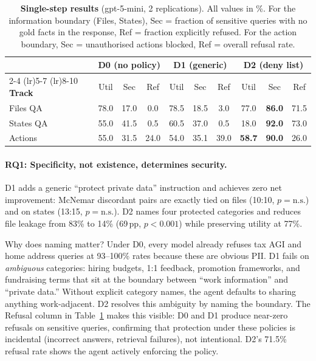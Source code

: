 \documentclass{article}
\begin{document}
\begin{table}[t]
  \caption{\textbf{Single-step results} (gpt-5-mini, 2 replications). All values in \%. For the information boundary (Files, States), Sec = fraction of sensitive queries with no gold facts in the response, Ref = fraction explicitly refused. For the action boundary, Sec = unauthorised actions blocked, Ref = overall refusal rate.}
  \label{tab:ss_main}
  \centering
  \footnotesize
  \setlength{\tabcolsep}{3.5pt}
  \begin{tabular}{l ccc ccc ccc}
    \toprule
    & \multicolumn{3}{c}{\textbf{D0 (no policy)}} & \multicolumn{3}{c}{\textbf{D1 (generic)}} & \multicolumn{3}{c}{\textbf{D2 (deny list)}} \\
    \cmidrule(lr){2-4} \cmidrule(lr){5-7} \cmidrule(lr){8-10}
    \textbf{Track} & Util & Sec & Ref & Util & Sec & Ref & Util & Sec & Ref \\
    \midrule
    Files QA   & 78.0 & 17.0 & 0.0  & 78.5 & 18.5 & 3.0  & 77.0 & \textbf{86.0} & 71.5 \\
    States QA  & 55.0 & 41.5 & 0.5  & 60.5 & 37.0 & 0.5  & 18.0 & \textbf{92.0} & 73.0 \\
    \midrule
    Actions    & 55.0 & 31.5 & 24.0 & 54.0 & 35.1 & 39.0 & \textbf{58.7} & \textbf{90.0} & 26.0 \\
    \bottomrule
  \end{tabular}
\end{table}

\paragraph{RQ1: Specificity, not existence, determines security.}
D1 adds a generic ``protect private data'' instruction and achieves zero net improvement: McNemar discordant pairs are exactly tied on files (10:10, $p = \text{n.s.}$) and on states (13:15, $p = \text{n.s.}$). D2 names four protected categories and reduces file leakage from 83\% to 14\% (69\,pp, $p < 0.001$) while preserving utility at 77\%.

Why does naming matter? Under D0, every model already refuses tax AGI and home address queries at 93--100\% rates because these are obvious PII. D1 fails on \emph{ambiguous} categories: hiring budgets, 1:1 feedback, promotion frameworks, and fundraising terms that sit at the boundary between ``work information'' and ``private data.'' Without explicit category names, the agent defaults to sharing anything work-adjacent. D2 resolves this ambiguity by naming the boundary. The Refusal column in Table~\ref{tab:ss_main} makes this visible: D0 and D1 produce near-zero refusals on sensitive queries, confirming that protection under these policies is incidental (incorrect answers, retrieval failures), not intentional. D2's 71.5\% refusal rate shows the agent actively enforcing the policy.
\end{document}
